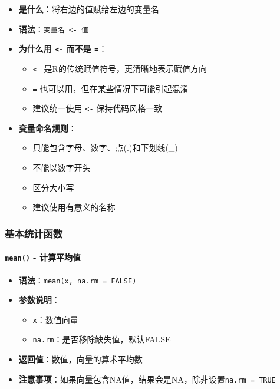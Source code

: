 \documentclass[
]{book}
\providecommand{\tightlist}{%
  \setlength{\itemsep}{0pt}\setlength{\parskip}{0pt}}
\begin{document}
\begin{itemize}
\tightlist
\item
  \textbf{是什么}：将右边的值赋给左边的变量名
\item
  \textbf{语法}：\texttt{变量名\ \textless{}-\ 值}
\item
  \textbf{为什么用 \texttt{\textless{}-} 而不是 \texttt{=}}：

  \begin{itemize}
  \tightlist
  \item
    \texttt{\textless{}-} 是R的传统赋值符号，更清晰地表示赋值方向
  \item
    \texttt{=} 也可以用，但在某些情况下可能引起混淆
  \item
    建议统一使用 \texttt{\textless{}-} 保持代码风格一致
  \end{itemize}
\item
  \textbf{变量命名规则}：

  \begin{itemize}
  \tightlist
  \item
    只能包含字母、数字、点(.)和下划线(\_)
  \item
    不能以数字开头
  \item
    区分大小写
  \item
    建议使用有意义的名称
  \end{itemize}
\end{itemize}

\hypertarget{ux57faux672cux7edfux8ba1ux51fdux6570}{%
\subsubsection{基本统计函数}\label{ux57faux672cux7edfux8ba1ux51fdux6570}}

\hypertarget{mean---ux8ba1ux7b97ux5e73ux5747ux503c}{%
\paragraph{\texorpdfstring{\texttt{mean()} - 计算平均值}{mean() - 计算平均值}}\label{mean---ux8ba1ux7b97ux5e73ux5747ux503c}}

\begin{itemize}
\tightlist
\item
  \textbf{语法}：\texttt{mean(x,\ na.rm\ =\ FALSE)}
\item
  \textbf{参数说明}：

  \begin{itemize}
  \tightlist
  \item
    \texttt{x}：数值向量
  \item
    \texttt{na.rm}：是否移除缺失值，默认FALSE
  \end{itemize}
\item
  \textbf{返回值}：数值，向量的算术平均数
\item
  \textbf{注意事项}：如果向量包含NA值，结果会是NA，除非设置\texttt{na.rm\ =\ TRUE}
\end{itemize}
\end{document}
